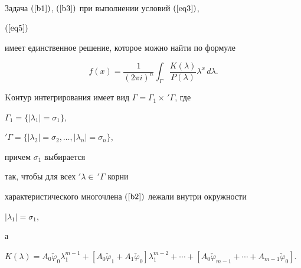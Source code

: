 \begin{thmnonum}


Задача $(\ref{b1})$, $(\ref{b3})$ при выполнении условий $(\ref{eq3})$,


$(\ref{eq5})$


имеет единственное решение, которое можно найти по формуле


\begin{equation}


f(x)=\frac1{(2\pi i)^n}\int_\Gamma\frac{K(\lambda)}{P(\lambda)}\lambda^x\,


d\lambda.\label{b4}


\end{equation}


Kонтур интегрирования имеет вид $\Gamma=\Gamma_1\times\,'\Gamma$, где


$\Gamma_1=\{|\lambda_1|=\sigma_1\}$,


$'\Gamma=\{|\lambda_2|=\sigma_2, \dotsc, |\lambda_n|=\sigma_n\}$,


причем $\sigma_1$ выбирается


так, чтобы для всех $'\lambda\in\,'\Gamma$ корни


характеристического многочлена $(\ref{b2})$ лежали внутри окружности


$|\lambda_1|=\sigma_1$,


а


$K(\lambda)=A_0\check\varphi_0\lambda_1^{m-1}+


[A_0\check\varphi_1+A_1\check\varphi_0]


\lambda_1^{m-2}+\dotsb


+[A_0\check\varphi_{m-1}+\dotsb+A_{m-1}\check\varphi_0]$.


\end{thmnonum}





